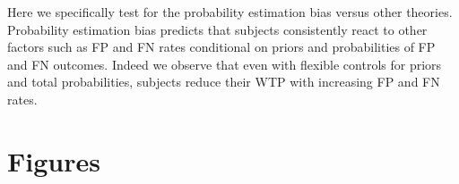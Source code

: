 \documentclass[12pt,a4paper]{article}
\begin{document}
Here we specifically test for the probability estimation bias versus other theories. Probability estimation bias predicts that subjects consistently react to other factors such as FP and FN rates conditional on priors and probabilities of FP and FN outcomes. Indeed we observe that even with flexible controls for priors and total probabilities, subjects reduce their WTP with increasing FP and FN rates.  


\newpage
\singlespacing
\small




 
\appendix

\newpage








%

%



\newpage
\section{Figures}
\end{document}
